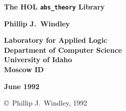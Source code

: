 
\begin{titlepage}

\setcounter{page}{1}                      %


\mbox{}
\vskip20mm
\begin{center}
{\Huge\bf The HOL {\tt abs\_theory} Library}
\end{center}


\vskip15mm
\begin{center}
\large\bf Phillip J.~Windley
\end{center}


\vfill
\begin{center}
\bf
Laboratory for Applied Logic\\
Department of Computer Science\\
University of Idaho\\
Moscow ID
\end{center}


\vskip5mm
\begin{center}
\bf June 1992
\end{center}

\end{titlepage}

\thispagestyle{empty}
\mbox{}

\vfill
\begin{center}
\copyright\ Phillip J.~Windley, 1992
\end{center}
\newpage
